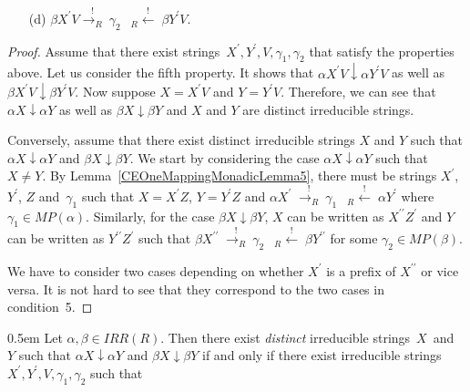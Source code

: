 \documentclass{lmcs} %
\theoremstyle{plain}\newtheorem{satz}[thm]{Satz} %
\begin{document}
\begin{appendices}
\begin{lem}
\begin{enumerate}
\begin{itemize}
  \item[(d)] $\beta X^{\prime} V \stackrel{!}{{\longrightarrow}_{R}^{}} ~ \gamma_2^{} \; \; ~ {}_R^{}{\!{\stackrel{!}{\longleftarrow}}} \;
  \beta Y^{\prime} V$.
\end{itemize}

\end{enumerate}

\end{lem}
\begin{proof}
Assume that there exist strings~$X^{\prime}, Y^{\prime}, V,
\gamma_1^{}, \gamma_2^{}$ that satisfy the properties above. Let us
consider the fifth property. It shows that $\alpha X^{\prime} V
\downarrow \alpha Y^{\prime} V$ as well as $\beta X^{\prime} V
\downarrow \beta Y^{\prime} V$.  Now suppose $X = X^{\prime} V$ and $Y
= Y^{\prime} V$. Therefore, we can see that $\alpha X \downarrow
\alpha Y$ as well as $\beta X \downarrow \beta Y$ and $X$ and $Y$ are
distinct irreducible strings.

Conversely, assume that there exist distinct irreducible strings $X$
and $Y$ such that $\alpha X \downarrow \alpha Y$ and $\beta X
\downarrow \beta Y$. We start by considering the case $\alpha X
\downarrow \alpha Y$ such that $X \neq Y$.
By Lemma~\ref{CEOneMappingMonadicLemma5}, there must be strings
$X^{\prime}$, $Y^{\prime}$, $Z$ and~$\gamma_1$ such that $X=X^{\prime} Z$,
$Y=Y^{\prime} Z$ and 
$\alpha X^{\prime} \; \stackrel{!}{{\longrightarrow}_{R}^{}} ~ \gamma_1 ~ \; \; {}_R^{}{\!{\stackrel{!}{\longleftarrow}}} \; \alpha Y^{\prime}$
where~$\gamma_1 \in MP(\alpha)$.
Similarly, for the case $\beta X \downarrow \beta
Y$, $X$ can be written as $X^{\prime\prime} Z^{\prime}$ and $Y$
can be written as $Y^{\prime\prime} Z^{\prime}$ such that 
$\beta X^{\prime\prime} \; \stackrel{!}{{\longrightarrow}_{R}^{}} ~ \gamma_2 \; \; ~ {}_R^{}{\!{\stackrel{!}{\longleftarrow}}} \; \beta Y^{\prime\prime}$ for some $\gamma_2 \in MP(\beta)$.


We have to consider two cases depending on whether $X^{\prime}$ is a
prefix of $X^{\prime\prime}$ or vice versa. It is not hard to see that
they correspond to the two cases in condition~5.
\end{proof}


\begin{cor}{\label{CEOneMappingMonadicLemma3}}
\openup 0.5em
  Let $\alpha, \beta \in IRR(R)$. Then there exist \emph{distinct}
  irreducible strings~$X$~and~$Y$ such that $\alpha X \downarrow
  \alpha Y$ and $\beta X \downarrow \beta Y$ if and only if there
  exist irreducible strings~$X^{\prime}, Y^{\prime}, V, \gamma_1^{}, \gamma_2^{}$ such that


\end{cor}
\end{appendices}
\end{document}
